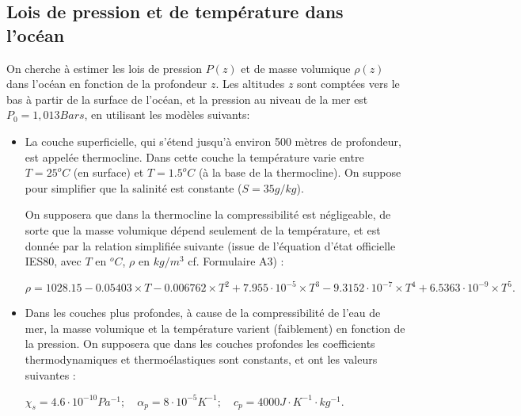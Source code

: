 \subsection{Lois de pression et de température dans l'océan}

On cherche à estimer les lois de pression $P(z)$ et de 
masse volumique $\rho(z)$ dans l'océan en fonction de la profondeur $z$.
Les altitudes $z$ sont comptées vers le bas à partir de la surface
de l'océan, et la pression au niveau de la mer est $P_0 = 1,013 Bars$, en utilisant les modèles suivants:

\begin{itemize}

\item La couche superficielle, qui s'étend jusqu'à environ 500 mètres de 
profondeur, est appelée thermocline. Dans cette couche la température
varie entre $T = 25^o C$ (en surface) et $T = 1.5^o C$ (à la base de la
thermocline). On suppose pour simplifier que la salinité est constante ($S = 35g/kg$).

On supposera que dans la thermocline la compressibilité est négligeable, de sorte que 
la masse volumique dépend seulement de la température, et est donnée par la relation 
simplifiée suivante (issue de l'équation d'état officielle IES80, avec $T$ en $^o C$, $\rho$ en $kg/m^3$ cf. Formulaire A3) :

$
\rho = 1028.15 - 0.05403 \times T - 0.006762\times  T^2 +7.955\cdot 10^{-5} \times T^3 - 9.3152 \cdot 10^{-7} \times T^4
+ 6.5363  \cdot 10^{-9}  \times T^5.
$




\item Dans les couches plus profondes,  à cause de la compressibilité de l'eau de mer, la masse volumique et la température varient (faiblement) en fonction de la pression. On supposera que dans les couches profondes les coefficients
thermodynamiques et thermoélastiques sont constants, et ont les valeurs suivantes :

$
\chi_s = 4.6 \cdot 10^{-10} Pa^{-1} ; \quad 
\alpha_p = 8 \cdot 10^{-5} K^{-1} ; \quad 
c_p = 4000 J \cdot K^{-1} \cdot kg^{-1}.  
$







\end{itemize}


